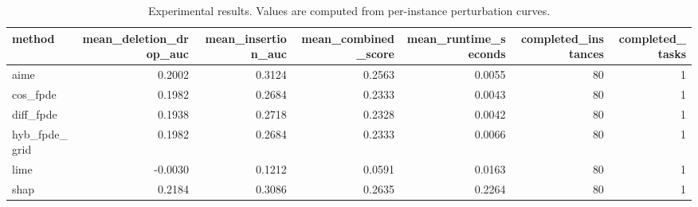 \begin{table}[t]
\caption{Experimental results. Values are computed from per-instance perturbation curves.}
\label{tab:main_results_computed}
\centering
\begin{tabular}{lrrrrrr}
\toprule
method & mean\_deletion\_drop\_auc & mean\_insertion\_auc & mean\_combined\_score & mean\_runtime\_seconds & completed\_instances & completed\_tasks \\
\midrule
aime & 0.2002 & 0.3124 & 0.2563 & 0.0055 & 80 & 1 \\
cos\_fpde & 0.1982 & 0.2684 & 0.2333 & 0.0043 & 80 & 1 \\
diff\_fpde & 0.1938 & 0.2718 & 0.2328 & 0.0042 & 80 & 1 \\
hyb\_fpde\_grid & 0.1982 & 0.2684 & 0.2333 & 0.0066 & 80 & 1 \\
lime & -0.0030 & 0.1212 & 0.0591 & 0.0163 & 80 & 1 \\
shap & 0.2184 & 0.3086 & 0.2635 & 0.2264 & 80 & 1 \\
\bottomrule
\end{tabular}

\end{table}

